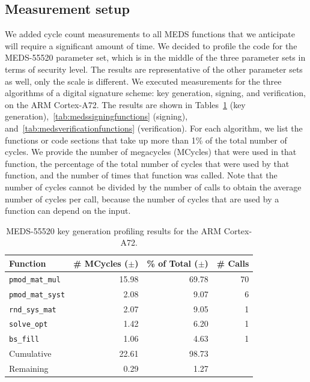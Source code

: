 \documentclass[11pt,a4paper]{report}
\theoremstyle{definition}
\begin{document}
\subsection{Measurement setup}
We added cycle count measurements to all MEDS functions that we anticipate will require a significant amount of time. We decided to profile the code for the MEDS-55520 parameter set, which is in the middle of the three parameter sets in terms of security level. The results are representative of the other parameter sets as well, only the scale is different. We executed measurements for the three algorithms of a digital signature scheme: key generation, signing, and verification, on the ARM Cortex-A72. The results are shown in Tables~\ref{tab:medskeygenfunctions} (key generation),~\ref{tab:medssigningfunctions} (signing), and~\ref{tab:medsverificationfunctions} (verification). For each algorithm, we list the functions or code sections that take up more than 1\% of the total number of cycles. We provide the number of megacycles (MCycles) that were used in that function, the percentage of the total number of cycles that were used by that function, and the number of times that function was called. Note that the number of cycles cannot be divided by the number of calls to obtain the average number of cycles per call, because the number of cycles that are used by a function can depend on the input.

\begin{table}
  \centering
  \caption{MEDS-55520 key generation profiling results for the ARM Cortex-A72.}
  \begin{tabular}{lrrr}
    \toprule
    \textbf{Function}        & \textbf{\# MCycles} ($\pm$) & \textbf{\% of Total} ($\pm$) & \textbf{\# Calls} \\
    \midrule
    \texttt{pmod\_mat\_mul}  & 15.98                       & 69.78                        & 70                \\
    \texttt{pmod\_mat\_syst} & 2.08                        & 9.07                         & 6                 \\
    \texttt{rnd\_sys\_mat}   & 2.07                        & 9.05                         & 1                 \\
    \texttt{solve\_opt}      & 1.42                        & 6.20                         & 1                 \\
    \texttt{bs\_fill}        & 1.06                        & 4.63                         & 1                 \\
    \midrule
    Cumulative               & 22.61                       & 98.73                        &                   \\
    Remaining                & 0.29                        & 1.27                         &                   \\
    \bottomrule
  \end{tabular}
  \label{tab:medskeygenfunctions}
\end{table}
\end{document}
